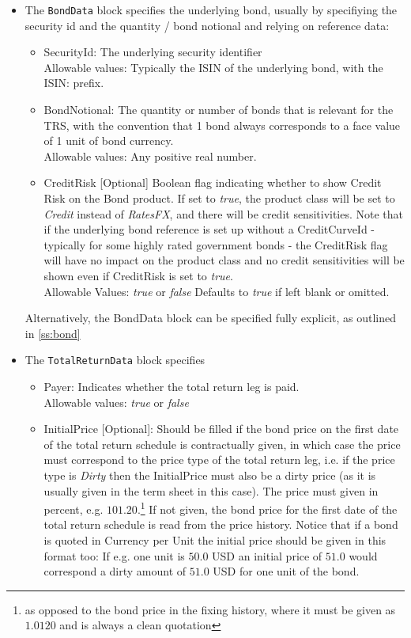 \begin{itemize}
\item The {\tt BondData} block specifies the underlying bond, usually by specifiying the security id and the quantity /
  bond notional and relying on reference data:

  \begin{itemize}
  \item SecurityId: The underlying security identifier\\
      Allowable values: Typically the ISIN of the underlying bond, with the ISIN: prefix.
  \item BondNotional: The quantity or number of bonds that is relevant for the TRS, with the convention that 1 bond always corresponds to a face value of 1 unit of bond currency.\\
      Allowable values: Any positive real number.
  \item CreditRisk [Optional] Boolean flag indicating whether to show Credit Risk on the Bond product. If set to \emph{true}, the product class will be set to \emph{Credit} instead of \emph{RatesFX}, and there will be credit sensitivities. Note that if the underlying bond reference is set up without a CreditCurveId - typically for some highly rated government bonds -  the CreditRisk flag will have no impact on the product class and no credit sensitivities will be shown even if CreditRisk is set to \emph{true}. \\
      Allowable Values: \emph{true} or \emph{false} Defaults to \emph{true} if left blank or omitted.          
  \end{itemize}

  Alternatively, the BondData block can be specified fully explicit, as outlined in \ref{ss:bond}

\item The {\tt TotalReturnData} block specifies
  \begin{itemize}
  \item Payer: Indicates whether the total return leg is paid.\\
    Allowable values: \emph{true} or \emph{false}

  \item InitialPrice [Optional]: Should be filled if the bond price on the first date of the total return schedule is
    contractually given, in which case the price must correspond to the price type of the total return leg, i.e. if the
    price type is \emph{Dirty} then the InitialPrice must also be a dirty price (as it is usually given in the term
    sheet in this case). The price must given in percent, e.g. $101.20$.\footnote{as opposed to the bond price in the
    fixing history, where it must be given as $1.0120$ and is always a clean quotation} If not given, the bond price for
    the first date of the total return schedule is read from the price history.  Notice that if a bond is quoted in
    Currency per Unit the initial price should be given in this format too: If e.g. one unit is $50.0$ USD an initial
    price of $51.0$ would correspond a dirty amount of $51.0$ USD for one unit of the bond.\\


\end{itemize}
\end{itemize}
